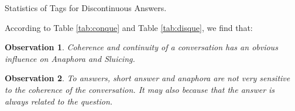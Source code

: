\documentclass[bsc,frontabs,twoside,singlespacing,parskip,deptreport]{infthesis}     %
\newtheorem{observation}{Observation}[chapter]
\begin{document}
\begin{minipage}{\textwidth}
\begin{minipage}[t]{0.45\textwidth}
        \end{minipage}
        \begin{minipage}[t]{0.45\textwidth}
        \centering
        \makeatletter{}\makeatother
{}
\caption{Statistics of Tags for Discontinuous Answers.}
\label{tab:disans}

        \end{minipage}
    \end{minipage}


According to Table \ref{tab:conque} and Table \ref{tab:disque}, we find that:

\begin{observation}
Coherence and continuity of a conversation has an obvious influence on Anaphora and Sluicing.
\end{observation}

\begin{observation}
To answers, short answer and anaphora are not very sensitive to the coherence of the conversation. It may also because that the answer is always related to the question. 
\end{observation}
\end{document}
